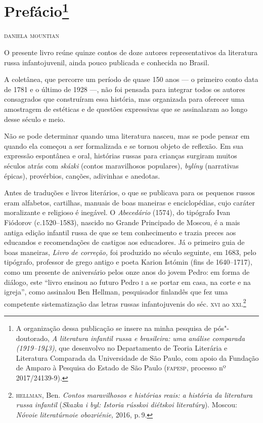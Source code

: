 \pagestyle{plain}
\chapter{Prefácio\footnote{A \label{part0}
  organização dessa publicação se insere na minha pesquisa de
  pós"-doutorado, \emph{A literatura infantil russa e brasileira: uma
  análise comparada (1919--1943)}, que desenvolvo no Departamento
  de Teoria Literária e Literatura Comparada da Universidade de São
  Paulo, com apoio da Fundação de Amparo à Pesquisa do Estado de São Paulo (\textsc{fapesp}, processo nº 2017/24139-9).}} \label{part0}

\begingroup\small
\begin{flushright}
\hfill\textsc{daniela mountian}
\end{flushright}


\noindent{}O presente livro reúne quinze contos de doze autores representativos da
literatura russa infantojuvenil, ainda pouco publicada e conhecida
no Brasil.

A coletânea, que percorre um período de quase 150 anos --- o primeiro conto data de
1781 e o último de 1928 ---, não foi pensada para integrar todos os
autores consagrados que construíram essa história, mas organizada para
oferecer uma amostragem de estéticas e de questões expressivas que se
assinalaram ao longo desse século e meio.

Não se pode determinar quando uma literatura nasceu, mas se pode pensar
em quando ela começou a ser formalizada e se tornou objeto de reflexão.
Em sua expressão espontânea e oral, histórias russas para crianças
surgiram muitos séculos atrás com \emph{skázki} (contos maravilhosos
populares), \emph{bylíny} (narrativas épicas), provérbios,
canções, adivinhas e anedotas.

Antes de traduções e livros literários, o que se publicava para os
pequenos russos eram alfabetos, cartilhas, manuais de boas maneiras e
enciclopédias, cujo caráter moralizante e religioso é
inegável. O \emph{Abecedário} (1574), do tipógrafo Ivan Fiódorov
(c.1520--1583), nascido no Grande Principado de Moscou, é a mais antiga
edição infantil russa de que se tem conhecimento e trazia preces aos
educandos e recomendações de castigos aos educadores. Já o primeiro guia
de boas maneiras, \emph{Livro de correção,} foi produzido no século
seguinte, em 1683, pelo tipógrafo, professor de grego antigo e poeta
Karion Istómin (fins de 1640--1717), como um presente de aniversário
pelos onze anos do jovem Pedro: em forma de diálogo, este ``livro
ensinou ao futuro Pedro \textsc{i} a se portar em casa, na corte e na igreja'',
como assinalou Ben Hellman, pesquisador finlandês que fez uma competente
sistematização das letras russas infantojuvenis do séc. \textsc{xvi} ao
\textsc{xxi}.\footnote{\textsc{hellman}, Ben. \emph{Contos maravilhosos e histórias reais:
  a história da literatura russa infantil} (\emph{Skazka i byl: Istoria
  rússkoi diétskoi literatúry}). Moscou: \emph{Nóvoie
  literatúrnoie obozriénie,} 2016, p.\,9.}

